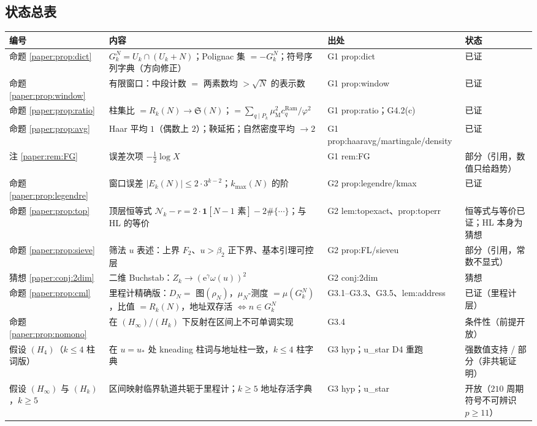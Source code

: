 \documentclass[11pt,a4paper]{article}
\newcommand{\Haar}{\mu}
\newcommand{\Sing}{\mathfrak S}
\newcommand{\Cnt}{\mathcal N}          %
\newcommand{\kmax}{k_{\max}}           %
\newcommand{\ust}{u_{*}}               %
\newcommand{\Mob}{\mu_{\mathrm{M}}}    %
\newcommand{\ee}{\mathrm e}
\newcommand{\Ram}{c^{\mathrm{Ram}}}    %
\theoremstyle{plain}
\theoremstyle{definition}
\begin{document}
\begin{CJK}{UTF8}{gbsn}
\section*{状态总表}
\begin{center}
\small
\begin{tabular}{p{1.5cm}p{6.6cm}p{2.3cm}p{4.0cm}}
\hline
编号 & 内容 & 出处 & 状态\\
\hline
命题 \ref{paper:prop:dict} & $G_k^N=U_k\cap(U_k+N)$；Polignac 集 $=-G_k^N$；符号序列字典（方向修正） & G1 prop:dict & 已证\\
命题 \ref{paper:prop:window} & 有限窗口：中段计数 $=$ 两素数均 $>\sqrt N$ 的表示数 & G1 prop:window & 已证\\
命题 \ref{paper:prop:ratio} & 柱集比 $=R_k(N)\to\Sing(N)$；$=\sum_{q\mid P_k}\Mob^2\Ram_q/\varphi^2$ & G1 prop:ratio；G4.2(c) & 已证\\
命题 \ref{paper:prop:avg} & Haar 平均 $1$（偶数上 $2$）；鞅延拓；自然密度平均 $\to2$ & G1 prop:haaravg/martingale/density & 已证\\
注 \ref{paper:rem:FG} & 误差次项 $-\frac12\log X$ & G1 rem:FG & 部分（引用，数值只给趋势）\\
命题 \ref{paper:prop:legendre} & 窗口误差 $|E_k(N)|\le2\cdot3^{k-2}$；$\kmax(N)$ 的阶 & G2 prop:legendre/kmax & 已证\\
命题 \ref{paper:prop:top} & 顶层恒等式 $\Cnt_k-r=2\cdot\mathbf 1[N-1\text{ 素}]-2\#\{\cdots\}$；与 HL 的等价 & G2 lem:topexact、prop:toperr & 恒等式与等价已证；HL 本身为猜想\\
命题 \ref{paper:prop:sieve} & 筛法 $u$ 表述：上界 $F_2$、$u>\beta_2$ 正下界、基本引理可控层 & G2 prop:FL/sieveu & 部分（引用，常数不显式）\\
猜想 \ref{paper:conj:2dim} & 二维 Buchstab：$Z_k\to(\ee^\gamma\omega(u))^2$ & G2 conj:2dim & 猜想\\
命题 \ref{paper:prop:cml} & 里程计精确版：$D_N=$ 图$(\rho_N)$，$\Haar_N$-测度 $=\Haar(G_k^N)$，比值 $=R_k(N)$，地址双存活 $\iff n\in G_k^N$ & G3.1--G3.3、G3.5、lem:address & 已证（里程计层）\\
命题 \ref{paper:prop:nomono} & 在 $(H_\infty)$/$(H_k)$ 下反射在区间上不可单调实现 & G3.4 & 条件性（前提开放）\\
假设 $(H_4)$（$k\le4$ 柱词版） & 在 $u=\ust$ 处 kneading 柱词与地址柱一致，$k\le4$ 柱字典 & G3 hyp；u\_star D4 重跑 & 强数值支持 / 部分（非共轭证明）\\
假设 $(H_\infty)$ 与 $(H_k)$，$k\ge5$ & 区间映射临界轨道共轭于里程计；$k\ge5$ 地址存活字典 & G3 hyp；u\_star & 开放（$210$ 周期符号不可辨识 $p\ge11$）\\

\end{tabular}
\end{center}
\end{CJK}
\end{document}
